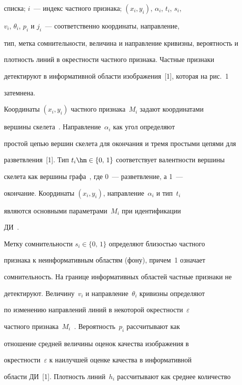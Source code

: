 списка; $i$~---  индекс частного признака; $(x_i,y_i)$, $\alpha_i$, $t_i$, $s_i$, 


$v_i$, $\theta_i$, $p_i$ и $j_i$~---  соответственно координаты, направление, 


тип, метка сомнительности, величина и направление кривизны, вероятность и 


плотность линий в окрестности частного признака. Частные признаки 


детектируют в информативной области изображения~[1], которая на рис.~1 


затемнена.


  


  Координаты $(x_i,y_i)$ частного признака~$M_i$ задают координатами 


вершины скелета~\cite{3-ush}. Направление~$\alpha_i$ как угол определяют 


простой цепью вершин скелета для окончания и тремя простыми цепями для 


разветвления~[1]. Тип $t_i\hm\in \{0,\,1\}$ соответствует валентности вершины 


скелета как вершины графа~\cite{10-ush}, где 0~--- разветвление, а 1~--- 


окончание. Координаты $(x_i,y_i)$, направление~$\alpha_i$ и тип~$t_i$ 


являются основными параметрами~$M_i$ при идентификации 


  ДИ~\cite{4-ush, 3-ush}.


  


  Метку сомнительности $s_i\in \{0,\,1\}$ определяют близостью частного 


признака к неинформативным областям (фону), причем~1 означает 


сомнительность. На границе информативных областей частные признаки не 


детектируют. Величину~$v_i$ и направление~$\theta_i$ кривизны определяют 


по изменению направлений линий в некоторой окрестности~$\varepsilon$ 


частного признака~$M_i$~\cite{3-ush}. Вероятность~$p_i$ рассчитывают как 


отношение средней величины оценок качества изображения в 


окрестности~$\varepsilon$ к наилучшей оценке качества в информативной 


области ДИ~[1]. Плотность линий~$h_i$ рассчитывают как среднее количество 



